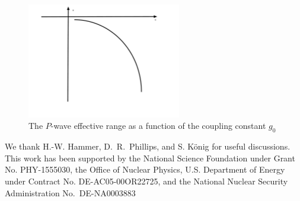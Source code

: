 \documentclass[aps,preprint,superscriptaddress]{revtex4-1}
\begin{document}
\begin{figure}[t]
\begin{center}
\includegraphics[width=0.6\textwidth,clip=true]{re-vs-g0} 
\end{center}
\caption{The $P$-wave effective range as a function of the coupling constant $g_0$}
\label{fig:Pwave-g0-re}
\end{figure}
\begin{acknowledgments}
  We thank H.-W. Hammer, D.~R.~Phillips, and S. K\"onig for useful discussions.
  This work has been supported by the National Science Foundation under Grant
  No. PHY-1555030, the Office of Nuclear Physics, U.S. Department of Energy
  under Contract No. DE-AC05-00OR22725, and the National Nuclear Security
  Administration No.~DE-NA0003883
\end{acknowledgments}




\end{document}
